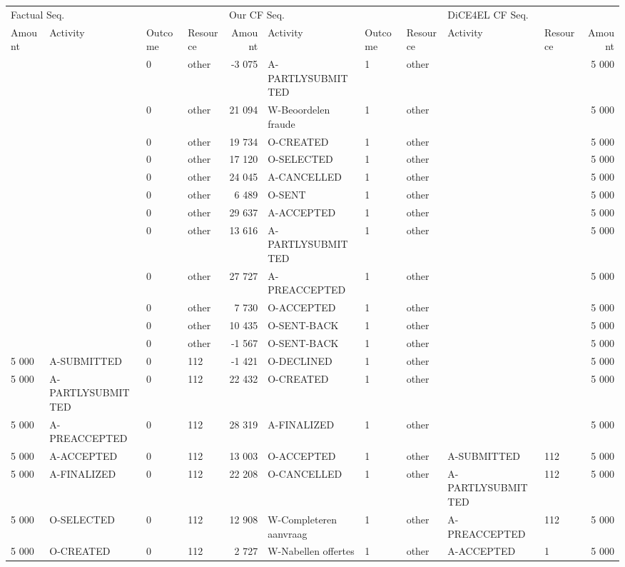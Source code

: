 \begin{tabular}{llllrlllllr}
\toprule
\multicolumn{4}{l}{Factual Seq.} & \multicolumn{4}{l}{Our CF Seq.} & \multicolumn{3}{l}{DiCE4EL CF Seq.} \\
Amount & Activity & Outcome & Resource & Amount & Activity & Outcome & Resource & Activity & Resource & Amount \\
\midrule
 &  & 0 & other & -3 075 & A-PARTLYSUBMITTED & 1 & other &  &  & 5 000 \\
 &  & 0 & other & 21 094 & W-Beoordelen fraude & 1 & other &  &  & 5 000 \\
 &  & 0 & other & 19 734 & O-CREATED & 1 & other &  &  & 5 000 \\
 &  & 0 & other & 17 120 & O-SELECTED & 1 & other &  &  & 5 000 \\
 &  & 0 & other & 24 045 & A-CANCELLED & 1 & other &  &  & 5 000 \\
 &  & 0 & other & 6 489 & O-SENT & 1 & other &  &  & 5 000 \\
 &  & 0 & other & 29 637 & A-ACCEPTED & 1 & other &  &  & 5 000 \\
 &  & 0 & other & 13 616 & A-PARTLYSUBMITTED & 1 & other &  &  & 5 000 \\
 &  & 0 & other & 27 727 & A-PREACCEPTED & 1 & other &  &  & 5 000 \\
 &  & 0 & other & 7 730 & O-ACCEPTED & 1 & other &  &  & 5 000 \\
 &  & 0 & other & 10 435 & O-SENT-BACK & 1 & other &  &  & 5 000 \\
 &  & 0 & other & -1 567 & O-SENT-BACK & 1 & other &  &  & 5 000 \\
5 000 & A-SUBMITTED & 0 & 112 & -1 421 & O-DECLINED & 1 & other &  &  & 5 000 \\
5 000 & A-PARTLYSUBMITTED & 0 & 112 & 22 432 & O-CREATED & 1 & other &  &  & 5 000 \\
5 000 & A-PREACCEPTED & 0 & 112 & 28 319 & A-FINALIZED & 1 & other &  &  & 5 000 \\
5 000 & A-ACCEPTED & 0 & 112 & 13 003 & O-ACCEPTED & 1 & other & A-SUBMITTED & 112 & 5 000 \\
5 000 & A-FINALIZED & 0 & 112 & 22 208 & O-CANCELLED & 1 & other & A-PARTLYSUBMITTED & 112 & 5 000 \\
5 000 & O-SELECTED & 0 & 112 & 12 908 & W-Completeren aanvraag & 1 & other & A-PREACCEPTED & 112 & 5 000 \\
5 000 & O-CREATED & 0 & 112 & 2 727 & W-Nabellen offertes & 1 & other & A-ACCEPTED & 1 & 5 000 \\

\end{tabular}
